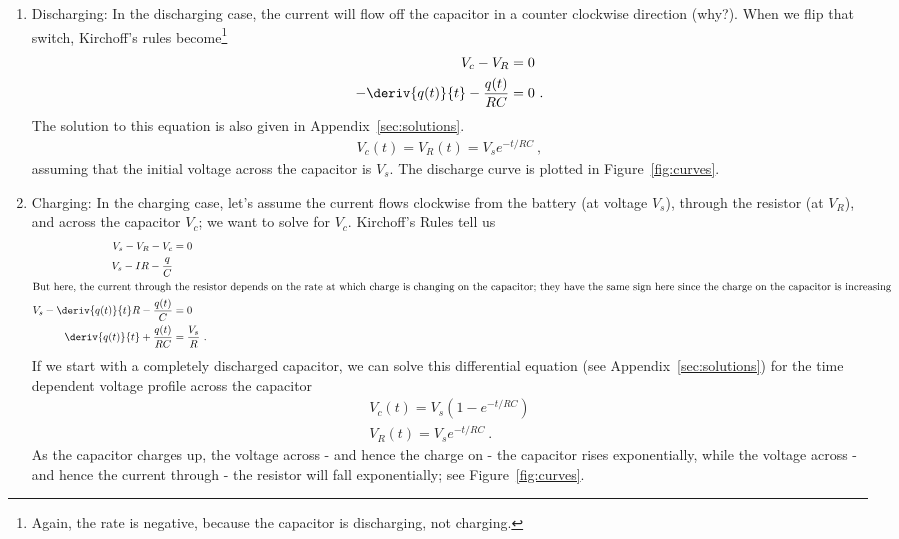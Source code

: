 \documentclass[12pt]{article}
\begin{document}
\begin{enumerate}
\item Discharging: In the discharging case, the current will flow off
  the capacitor in a counter clockwise direction (why?).  When we flip
  that switch, Kirchoff's rules become\footnote{Again, the rate is
    negative, because the capacitor is discharging, not charging.}
  \begin{align*}
    V_c - V_R &= 0\\
    -\deriv{q(t)}{t} - \frac{q(t)}{RC} &= 0\ .
  \end{align*}
  The solution to this equation is also given in
  Appendix~\ref{sec:solutions}.
  \begin{gather*}
    V_c(t) = V_R(t) = V_s e^{-t/RC}\ ,
  \end{gather*}
  assuming that the initial voltage across the capacitor is $V_s$.
  The discharge curve is plotted in Figure~\ref{fig:curves}.
\item Charging: In the charging case, let's assume the current flows
  clockwise from the battery (at voltage $V_s$), through the resistor
  (at $V_R$), and across the capacitor $V_c$;  we want to solve for
  $V_c$.  Kirchoff's Rules tell us
  \begin{align*}
    V_s - V_R - V_c &= 0\\
    V_s - I R - \frac{q}{C}\\
    \intertext{But here, the current through the resistor depends on
      the rate at which charge is changing on the capacitor; they have
      the same sign here since the charge on the capacitor is
      increasing}
    V_s - \deriv{q(t)}{t} R - \frac{q(t)}{C} &=0\\
    \deriv{q(t)}{t} + \frac{q(t)}{RC} &= \frac{V_s}{R}\ .
  \end{align*}
  If we start with a completely discharged capacitor, we can solve
  this differential equation (see Appendix~\ref{sec:solutions}) for
  the time dependent voltage profile across the capacitor
  \begin{gather*}
    V_c(t) = V_s \left( 1 - e^{-t/RC} \right)\\
    V_R(t) = V_s e^{-t/RC}\ .
  \end{gather*}
  As the capacitor charges up, the voltage across - and hence the
  charge on - the capacitor rises exponentially, while the voltage
  across - and hence the current through - the resistor will fall
  exponentially; see Figure~\ref{fig:curves}.
\end{enumerate}
\end{document}
